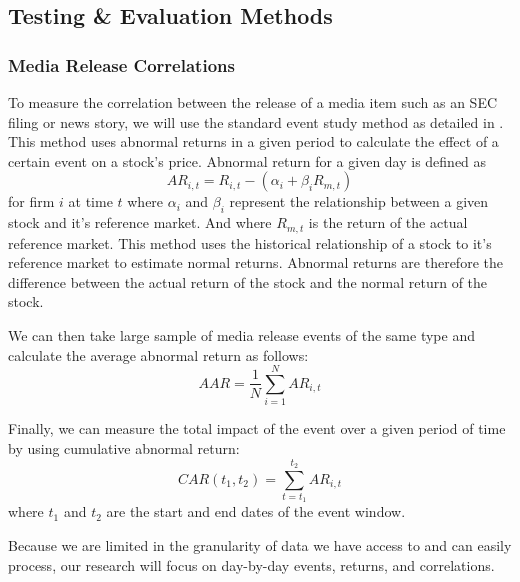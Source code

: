 \documentclass[conference]{IEEEtran}
\begin{document}
\subsection{Testing \& Evaluation Methods}
\subsubsection{Media Release Correlations}
To measure the correlation between the release of a media item such as an SEC filing or news story, we will use the standard event study method as detailed in \cite{Neuhierl2010}. This method uses abnormal returns in a given period to calculate the effect of a certain event on a stock's price. Abnormal return for a given day is defined as 
\begin{equation}
	AR_{i,t}=R_{i,t}-(\alpha_i+\beta_i R_{m,t})
\end{equation}
for firm $i$ at time $t$ where $\alpha_i$ and $\beta_i$ represent the relationship between a given stock and it's reference market. And where $R_{m,t}$ is the return of the actual reference market. This method uses the historical relationship of a stock to it's reference market to estimate normal returns. Abnormal returns are therefore the difference between the actual return of the stock and the normal return of the stock. 

We can then take large sample of media release events of the same type and calculate the average abnormal return as follows:
\begin{equation}
	AAR= \frac{1}{N} \sum\limits_{i=1}^{N}AR_{i,t}
\end{equation}

Finally, we can measure the total impact of the event over a given period of time by using cumulative abnormal return:
\begin{equation}
	CAR(t_1,t_2)=\sum\limits_{t=t_1}^{t_2} AR_{i,t} 
\end{equation}
where $t_1$ and $t_2$ are the start and end dates of the event window.

Because we are limited in the granularity of data we have access to and can easily process, our research will focus on day-by-day events, returns, and correlations.
\end{document}
